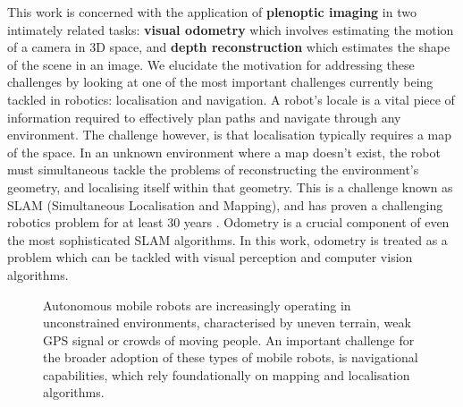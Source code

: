 This work is concerned with the application of \textbf{plenoptic imaging} in two intimately related tasks: \textbf{visual odometry} which involves estimating the motion of a camera in 3D space, and \textbf{depth reconstruction} which estimates the shape of the scene in an image. We elucidate the motivation for addressing these challenges by looking at one of the most important challenges currently being tackled in robotics: localisation and navigation. A robot's locale is a vital piece of information required to effectively plan paths and navigate through any environment. The challenge however, is that localisation typically requires a map of the space. In an unknown environment where a map doesn't exist, the robot must simultaneous tackle the problems of reconstructing the environment's geometry, and localising itself within that geometry. This is a challenge known as SLAM (Simultaneous Localisation and Mapping), and has proven a challenging robotics problem for at least 30 years \cite{cadena2016slam, kuehefuss2016rgbdslam}. Odometry is a crucial component of even the most sophisticated SLAM algorithms. In this work, odometry is treated as a problem which can be tackled with visual perception and computer vision algorithms. 

\begin{figure}[htbp]
    
    
    \caption[Examples of robots that operate in unconstrained spaces.]{Autonomous mobile robots are increasingly operating in unconstrained environments, characterised by uneven terrain, weak GPS signal or crowds of moving people. An important challenge for the broader adoption of these types of mobile robots, is navigational capabilities, which rely foundationally on mapping and localisation algorithms.}
\end{figure}


